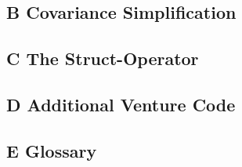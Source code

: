 \documentclass[twoside,11pt]{article}
\begin{document}
\subsection*{B Covariance Simplification}


\subsection*{C The Struct-Operator}


\subsection*{D Additional Venture Code}

\newpage
\subsection*{E Glossary}

%

\newpage


\end{document}
